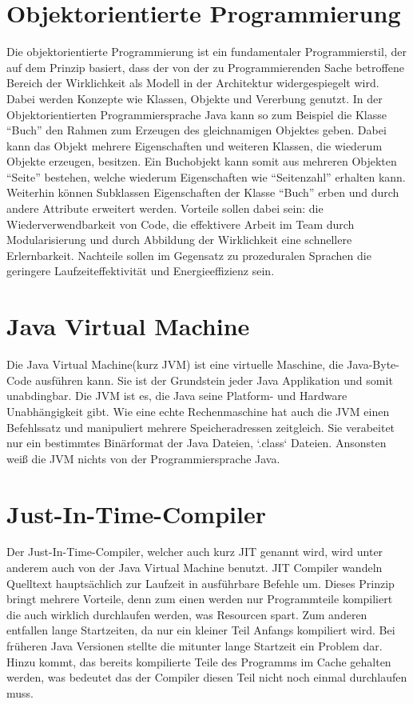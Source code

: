 \section{Objektorientierte Programmierung}
\label{sec:OO}
Die objektorientierte Programmierung ist ein fundamentaler Programmierstil, der
auf dem Prinzip basiert, dass der von der zu Programmierenden Sache betroffene
Bereich der Wirklichkeit als Modell in der Architektur widergespiegelt wird.
Dabei werden Konzepte wie Klassen, Objekte und Vererbung genutzt.
In der Objektorientierten Programmiersprache Java kann so zum Beispiel die
Klasse "`Buch"' den Rahmen zum Erzeugen des gleichnamigen Objektes geben. Dabei
kann das Objekt mehrere Eigenschaften und weiteren Klassen, die
wiederum Objekte erzeugen, besitzen. Ein Buchobjekt kann somit aus mehreren
Objekten "`Seite"' bestehen, welche wiederum Eigenschaften wie "`Seitenzahl"'
erhalten kann. Weiterhin können Subklassen Eigenschaften der Klasse "`Buch"'
erben und durch andere Attribute erweitert werden.
Vorteile sollen dabei sein: die Wiederverwendbarkeit von Code, die effektivere
Arbeit im Team durch Modularisierung und durch Abbildung der Wirklichkeit eine
schnellere Erlernbarkeit. Nachteile sollen im Gegensatz zu prozeduralen Sprachen
die geringere Laufzeiteffektivität und Energieeffizienz sein.

\section{Java Virtual Machine}
\label{sec:JVM}
Die Java Virtual Machine(kurz JVM) ist eine virtuelle Maschine, die
Java-Byte-Code ausführen kann. Sie ist der Grundstein jeder Java Applikation und
somit unabdingbar. Die JVM ist es, die Java seine Platform- und Hardware
Unabhängigkeit gibt. Wie eine echte Rechenmaschine hat auch die JVM einen Befehlssatz und
manipuliert mehrere Speicheradressen zeitgleich. Sie verabeitet nur ein
bestimmtes Binärformat der Java Dateien, `.class` Dateien. Ansonsten weiß die
JVM nichts von der Programmiersprache Java.

\section{Just-In-Time-Compiler}
\label{sec:JIT}
Der Just-In-Time-Compiler, welcher auch kurz JIT genannt wird, wird unter
anderem auch von der Java Virtual Machine benutzt. JIT Compiler wandeln 
Quelltext hauptsächlich zur Laufzeit in ausführbare Befehle um. Dieses Prinzip
bringt mehrere Vorteile, denn zum einen werden nur Programmteile kompiliert die
auch wirklich durchlaufen werden, was Resourcen spart. Zum anderen entfallen
lange Startzeiten, da nur ein kleiner Teil Anfangs kompiliert wird. Bei früheren
Java Versionen stellte die mitunter lange Startzeit ein Problem dar. Hinzu
kommt, das bereits kompilierte Teile des Programms im Cache gehalten werden, was bedeutet das der
Compiler diesen Teil nicht noch einmal durchlaufen muss.


